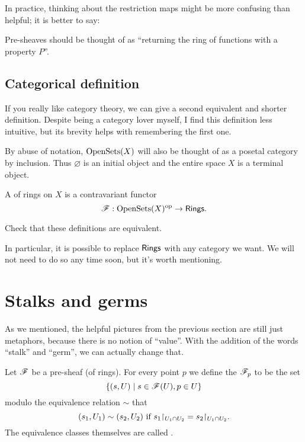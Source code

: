 In practice, thinking about the restriction maps
might be more confusing than helpful; it is better to say:
\begin{moral}
	Pre-sheaves should be thought of as
	``returning the ring of functions with a property $P$''.
\end{moral}

\subsection{Categorical definition}
If you really like category theory,
we can give a second equivalent and shorter definition.
Despite being a category lover myself,
I find this definition less intuitive,
but its brevity helps with remembering the first one.
\begin{abuse}
	By abuse of notation, $\operatorname{OpenSets}(X)$ will also be thought of as a
	posetal category by inclusion. Thus $\varnothing$ is an initial object
	and the entire space $X$ is a terminal object.
\end{abuse}
\begin{definition}
	A  of rings on $X$ is a contravariant functor
	\[ \mathscr F : \operatorname{OpenSets}(X)^{\mathrm{op}} \to \mathsf{Rings}. \]
\end{definition}
\begin{exercise}
	Check that these definitions are equivalent.
\end{exercise}
In particular, it is possible to replace $\mathsf{Rings}$ with any category we want.
We will not need to do so any time soon, but it's worth mentioning.


\section{Stalks and germs}

As we mentioned, the helpful pictures from the previous section
are still just metaphors, because there is no notion of ``value''.
With the addition of the words ``stalk'' and ``germ'',
we can actually change that.

\begin{definition}
	Let $\mathscr F$ be a pre-sheaf (of rings).
	For every point $p$ we define the  $\mathscr F_p$ to be the set
	\[ \left\{ (s, U) \mid s \in \mathscr F(U), p \in U \right\} \]
	modulo the equivalence relation $\sim$ that
	\[ (s_1,U_1) \sim (s_2, U_2) \text{ if }
		s_1 \restrict{U_1 \cap U_2} = s_2 \restrict{U_1 \cap U_2}. \]
	The equivalence classes themselves are called .
\end{definition}

